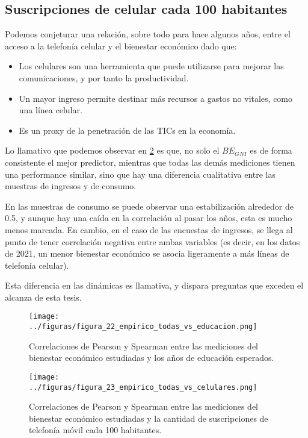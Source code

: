 \subsection{Suscripciones de celular cada 100 habitantes}

Podemos conjeturar una relación, sobre todo para hace algunos años, entre el acceso a la telefonía celular y el bienestar económico dado que:

\begin{itemize}
    \item Los celulares son una herramienta que puede utilizarse para mejorar las comunicaciones, y por tanto la productividad.
    \item Un mayor ingreso permite destinar más recursos a gastos no vitales, como una línea celular.
    \item Es un proxy de la penetración de las TICs en la economía.
\end{itemize}

Lo llamativo que podemos observar en \ref{fig:23} es que, no solo el $BE_{GNI}$ es de forma consistente el mejor predictor, mientras que todas las demás mediciones tienen una performance similar, sino que hay una diferencia cualitativa entre las muestras de ingresos y de consumo.

En las muestras de consumo se puede observar una estabilización alrededor de 0.5, y aunque hay una caída en la correlación al pasar los años, esta es mucho menos marcada. En cambio, en el caso de las encuestas de ingresos, se llega al punto de tener correlación negativa entre ambas variables (es decir, en los datos de 2021, un menor bienestar económico se asocia ligeramente a más líneas de telefonía celular).

Esta diferencia en las dinámicas es llamativa, y dispara preguntas que exceden el alcanza de esta tesis.

\begin{figure}[H] %
    \centering %
    \texttt{[image: ../figuras/figura\_22\_empirico\_todas\_vs\_educacion.png]} %
    \caption{Correlaciones de Pearson y Spearman entre las mediciones del bienestar económico estudiadas y los años de educación esperados. \cite{worldbank_gender_data}}
    \label{fig:22} %
\end{figure}


\begin{figure}[H] %
    \centering %
    \texttt{[image: ../figuras/figura\_23\_empirico\_todas\_vs\_celulares.png]} %
    \caption{Correlaciones de Pearson y Spearman entre las mediciones del bienestar económico estudiadas y la cantidad de suscripciones de telefonía móvil cada 100 habitantes. \cite{worldbank_gender_data}}
    \label{fig:23} %
\end{figure}